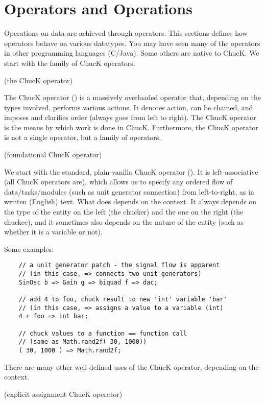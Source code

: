 \chapter{Operators and Operations}

Operations on data are achieved through operators. This sections defines how operators behave on various datatypes. You may have seen many of the operators in other programming languages (C/Java). Some others are native to ChucK. We start with the family of ChucK operators.

 

\chuckop (the ChucK operator)

The ChucK operator (\chuckop) is a massively overloaded operator that, depending on the types involved, performs various actions. It denotes action, can be chained, and imposes and clarifies order (always goes from left to right). The ChucK operator is the means by which work is done in ChucK. Furthermore, the ChucK operator is not a single operator, but a family of operators.

\chuckop (foundational ChucK operator)

We start with the standard, plain-vanilla ChucK operator (\chuckop). It is left-associative (all ChucK operators are), which allows us to specify any ordered flow of data/tasks/modules (such as unit generator connection) from left-to-right, as in written (English) text.  What \chuckop does depends on the context. It always depends on the type of the entity on the left (the chucker) and the one on the right (the chuckee), and it sometimes  also depends on the nature of the entity (such as whether it is a variable or not).

Some examples:
\begin{verbatim}
    // a unit generator patch - the signal flow is apparent
    // (in this case, => connects two unit generators)
    SinOsc b => Gain g => biquad f => dac;

    // add 4 to foo, chuck result to new 'int' variable 'bar'
    // (in this case, => assigns a value to a variable (int)
    4 + foo => int bar;

    // chuck values to a function == function call
    // (same as Math.rand2f( 30, 1000))
    ( 30, 1000 ) => Math.rand2f;
\end{verbatim}

There are many other well-defined uses of the ChucK operator, depending on the context.

\atchuckop (explicit assignment ChucK operator)

